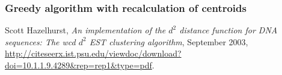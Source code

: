 \documentclass[11pt,a4paper]{article}
\begin{document}
\subsubsection{Greedy algorithm with recalculation of centroids}


\begin{thebibliography}{9}
    Scott Hazelhurst,
    \emph{An implementation of the $d^2$ distance function for DNA
      sequences: The wcd $d^2$ EST clustering algorithm},
      September 2003,
      \url{http://citeseerx.ist.psu.edu/viewdoc/download?doi=10.1.1.9.4289&rep=rep1&type=pdf}.
\end{thebibliography}
\end{document}
